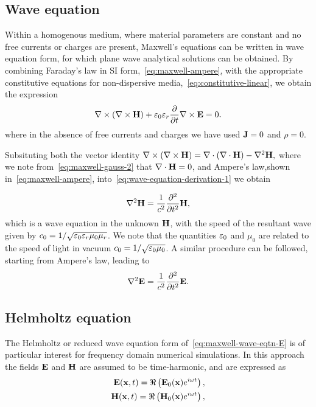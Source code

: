 \subsection{Wave equation}

Within a homogenous medium, where material parameters are constant and no free
currents or charges are present, Maxwell's equations can be written in wave
equation form, for which plane wave analytical solutions can be
obtained\cite{Jackson:490457}. By combining Faraday's law in SI
form,~\eqref{eq:maxwell-ampere}, with the appropriate constitutive equations for
non-dispersive media,~\eqref{eq:constitutive-linear}, we obtain the expression
\begin{equation}
  \label{eq:wave-equation-derivation-1}
  \nabla \times ( \nabla \times \mathbf{H} ) + \varepsilon_0 \varepsilon_r \frac{\partial}{\partial t}  \nabla \times \mathbf{E} = 0 .
\end{equation}
where in the absence of free currents and charges we have used $\mathbf{J} = 0$ and
$\rho = 0$.

Subsituting both the vector identity $ \nabla \times ( \nabla \times \mathbf{H} ) =
\nabla \cdot ( \nabla \cdot \mathbf{H} ) - \nabla^2 \mathbf{H}, $ where we note
from~\eqref{eq:maxwell-gauss-2} that $\nabla \cdot \mathbf{H} = 0$, and Ampere's
law,shown in~\eqref{eq:maxwell-ampere},
into~\eqref{eq:wave-equation-derivation-1} we obtain

\begin{equation}
  \label{eq:maxwell-wave-eqtn-H}
  \nabla^2 \mathbf{H} = \frac{1}{c^2} \frac{\partial^2}{\partial t^2}{ \mathbf{H} },
\end{equation}
which is a wave equation in the unknown $\mathbf{H}$, with the speed of the resultant
wave given by $c_0 = 1/\sqrt{\varepsilon_0 \varepsilon_r \mu_0 \mu_r }$. We note that the
quantities $\varepsilon_0$ and $\mu_0$ are related to the speed of light in vacuum $c_0
= 1/\sqrt{\varepsilon_0 \mu_0 }$. A similar procedure can be followed, starting from
Ampere's law, leading to
\begin{equation}
  \label{eq:maxwell-wave-eqtn-E}
  \nabla^2 \mathbf{E} = \frac{1}{c^2} \frac{\partial^2}{\partial t^2}{ \mathbf{E} } .
\end{equation}

\subsection{Helmholtz equation}
The Helmholtz or reduced wave equation form of~\eqref{eq:maxwell-wave-eqtn-E} is
of particular interest for frequency domain numerical simulations. In this
approach the fields $\mathbf{E}$ and $\mathbf{H}$ are assumed to be time-harmonic, and are
expressed as
\begin{align}
  \label{eq:maxwell-helmholtz-time-harmonic}
  \mathbf{E}(\mathbf{x},t) = \Re \left( \mathbf{E}_0(\mathbf{x}) e^{i \omega t} \right), \\
  \mathbf{H}(\mathbf{x},t) = \Re \left( \mathbf{H}_0(\mathbf{x}) e^{i \omega t} \right),
\end{align}

